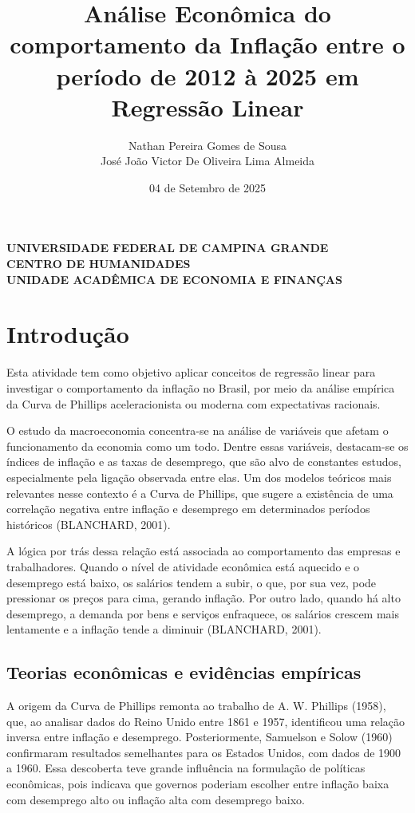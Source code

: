 \documentclass[12pt,oneside]{abntex2}
\title{Análise Econômica do comportamento da Inflação entre o período de 2012 à 2025 em Regressão Linear}
\author{Nathan Pereira Gomes de Sousa \\ José João Victor De Oliveira Lima Almeida }
\date{04 de Setembro de 2025}
\begin{document}
\begin{center}
{\textbf{\fontsize{14}{16}\selectfont 
UNIVERSIDADE FEDERAL DE CAMPINA GRANDE\\[1ex]
CENTRO DE HUMANIDADES\\[1ex]
UNIDADE ACADÊMICA DE ECONOMIA E FINANÇAS}}
\end{center}

\imprimircapa

\imprimirfolhaderosto*

\tableofcontents*
\newpage

\section{\textbf{Introdução}}

Esta atividade tem como objetivo aplicar conceitos de regressão linear para investigar o comportamento da inflação no Brasil, por meio da análise empírica da Curva de Phillips aceleracionista ou moderna com expectativas racionais.

O estudo da macroeconomia concentra-se na análise de variáveis que afetam o funcionamento da economia como um todo. Dentre essas variáveis, destacam-se os índices de inflação e as taxas de desemprego, que são alvo de constantes estudos, especialmente pela ligação observada entre elas. Um dos modelos teóricos mais relevantes nesse contexto é a Curva de Phillips, que sugere a existência de uma correlação negativa entre inflação e desemprego em determinados períodos históricos (BLANCHARD, 2001).

A lógica por trás dessa relação está associada ao comportamento das empresas e trabalhadores. Quando o nível de atividade econômica está aquecido e o desemprego está baixo, os salários tendem a subir, o que, por sua vez, pode pressionar os preços para cima, gerando inflação. Por outro lado, quando há alto desemprego, a demanda por bens e serviços enfraquece, os salários crescem mais lentamente e a inflação tende a diminuir (BLANCHARD, 2001).

\subsection*{\textbf{Teorias econômicas e evidências empíricas}}

A origem da Curva de Phillips remonta ao trabalho de A. W. Phillips (1958), que, ao analisar dados do Reino Unido entre 1861 e 1957, identificou uma relação inversa entre inflação e desemprego. Posteriormente, Samuelson e Solow (1960) confirmaram resultados semelhantes para os Estados Unidos, com dados de 1900 a 1960. Essa descoberta teve grande influência na formulação de políticas econômicas, pois indicava que governos poderiam escolher entre inflação baixa com desemprego alto ou inflação alta com desemprego baixo.  
\end{document}
